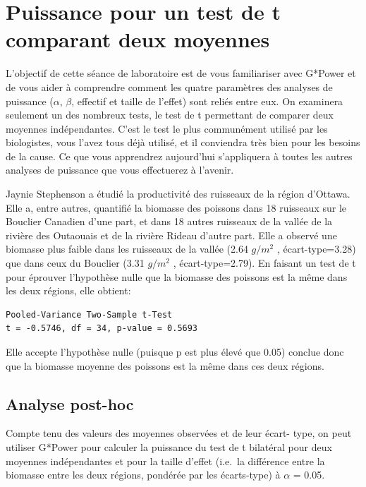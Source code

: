\documentclass[12pt,]{book}
\begin{document}
\hypertarget{puissance-pour-un-test-de-t-comparant-deux-moyennes}{%
\section{Puissance pour un test de t comparant deux moyennes}\label{puissance-pour-un-test-de-t-comparant-deux-moyennes}}

L'objectif de cette séance de laboratoire est de vous familiariser avec G*Power et de vous aider à comprendre comment les quatre paramètres des analyses de puissance (\(\alpha\), \(\beta\), effectif et taille de l'effet) sont reliés entre eux.
On examinera seulement un des nombreux tests, le test de t permettant de comparer deux moyennes indépendantes.
C'est le test le plus communément utilisé par les biologistes, vous l'avez tous déjà utilisé, et il conviendra très bien pour les besoins de la cause.
Ce que vous apprendrez aujourd'hui s'appliquera à toutes les autres analyses de puissance que vous effectuerez à l'avenir.

Jaynie Stephenson a étudié la productivité des ruisseaux de la région d'Ottawa.
Elle a, entre autres, quantifié la biomasse des poissons dans 18 ruisseaux sur le Bouclier Canadien d'une part, et dans 18 autres ruisseaux de la vallée de la rivière des Outaouais et de la rivière Rideau d'autre part.
Elle a observé une biomasse plus faible dans les ruisseaux de la vallée (2.64 \(g/m^2\) , écart-type=3.28) que dans ceux du Bouclier (3.31 \(g/m^2\) , écart-type=2.79).
En faisant un test de t pour éprouver l'hypothèse nulle que la biomasse des poissons est la même dans les deux régions, elle obtient:

\begin{verbatim}
Pooled-Variance Two-Sample t-Test
t = -0.5746, df = 34, p-value = 0.5693
\end{verbatim}

Elle accepte l'hypothèse nulle (puisque p est plus élevé que 0.05) conclue donc que la biomasse moyenne des poissons est la même dans ces deux régions.

\hypertarget{analyse-post-hoc}{%
\subsection{Analyse post-hoc}\label{analyse-post-hoc}}

Compte tenu des valeurs des moyennes observées et de leur écart- type, on peut utiliser G*Power pour calculer la puissance du test de t bilatéral pour deux moyennes indépendantes et pour la taille d'effet (i.e.~la différence entre la biomasse entre les deux régions, pondérée par les écarts-type) à \(\alpha\) = 0.05.
\end{document}

